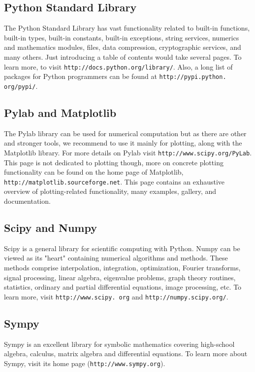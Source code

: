 \subsection{Python Standard Library}

The Python Standard Library has vast functionality related to 
built-in functions, built-in types, built-in constants, built-in
exceptions, string services, numerics and mathematics modules, files,
data compression, cryptographic services, and many others. Just introducing 
a table of contents would take several pages. To learn more,
to visit {\tt http://docs.python.org/library/}. Also, a long list of packages for Python 
programmers can be found at {\tt http://pypi.python. org/pypi/}.

\subsection{Pylab and Matplotlib}

The Pylab library can be used for numerical computation but as there are other 
and stronger tools, we recommend to use it mainly for plotting, along with the 
Matplotlib library. For more details on Pylab visit {\tt http://www.scipy.org/PyLab}.
This page is not dedicated to plotting though, more on concrete plotting functionality 
can be found on the home page of Matplotlib, {\tt http://matplotlib.sourceforge.net}.
This page contains an exhaustive overview of plotting-related functionality, many
examples, gallery, and documentation.

\subsection{Scipy and Numpy}

Scipy is a general library for scientific computing with 
Python. Numpy can be viewed as its "heart" containing numerical 
algorithms and methods. These methods comprise interpolation, 
integration, optimization, Fourier transforms, signal processing, 
linear algebra, eigenvalue problems, graph theory routines,
statistics, ordinary and partial differential equations,
image processing, etc. To learn more, visit 
{\tt http://www.scipy. org} and {\tt http://numpy.scipy.org/}. 

\subsection{Sympy}

Sympy is an excellent library for symbolic mathematics covering high-school 
algebra, calculus, matrix algebra and differential equations. To learn more
about Sympy, visit its home page ({\tt http://www.sympy.org}).

